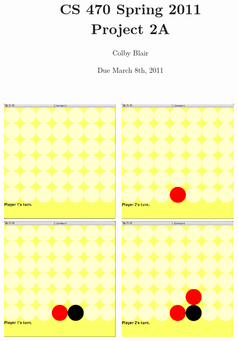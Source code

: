 \documentclass[12pt]{article}
\title{CS 470 Spring 2011 \\
     Project 2A}
\author{Colby Blair}
\date{Due March 8th, 2011}
\begin{document}
\maketitle
	\pagebreak

	\includegraphics[width=60mm,height=60mm]{report_images/01.png}
	\includegraphics[width=60mm,height=60mm]{report_images/02.png} \\
	\includegraphics[width=60mm,height=60mm]{report_images/03.png}
	\includegraphics[width=60mm,height=60mm]{report_images/04.png} \\
\end{document}
